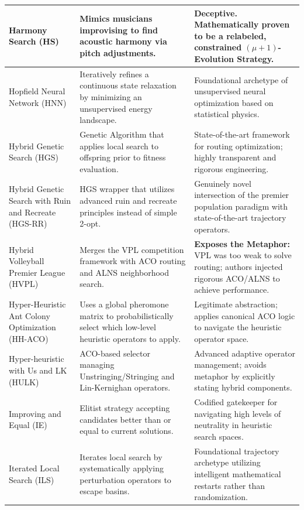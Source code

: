 \documentclass[orivec,runningheads]{llncs}
\begin{document}
\begin{center}
\begin{longtable}
\begin{center}
\begin{longtable}{
  >{\raggedright\arraybackslash}p{}
  >{\raggedright\arraybackslash}p{}
  >{\raggedright\arraybackslash}p{}
}
Harmony Search (HS) & Mimics musicians improvising to find acoustic harmony via pitch adjustments. & \textbf{Deceptive.} Mathematically proven to be a relabeled, constrained $(\mu + 1)$-Evolution Strategy. \\ \midrule

Hopfield Neural Network (HNN) & Iteratively refines a continuous state relaxation by minimizing an unsupervised energy landscape. & Foundational archetype of unsupervised neural optimization based on statistical physics. \\ \midrule

Hybrid Genetic Search (HGS) & Genetic Algorithm that applies local search to offspring prior to fitness evaluation. & State-of-the-art framework for routing optimization; highly transparent and rigorous engineering. \\ \midrule

Hybrid Genetic Search with Ruin and Recreate (HGS-RR) & HGS wrapper that utilizes advanced ruin and recreate principles instead of simple 2-opt. & Genuinely novel intersection of the premier population paradigm with state-of-the-art trajectory operators. \\ \midrule

Hybrid Volleyball Premier League (HVPL) & Merges the VPL competition framework with ACO routing and ALNS neighborhood search. & \textbf{Exposes the Metaphor:} VPL was too weak to solve routing; authors injected rigorous ACO/ALNS to achieve performance. \\ \midrule

Hyper-Heuristic Ant Colony Optimization (HH-ACO) & Uses a global pheromone matrix to probabilistically select which low-level heuristic operators to apply. & Legitimate abstraction; applies canonical ACO logic to navigate the heuristic operator space. \\ \midrule

Hyper-heuristic with Us and LK (HULK) & ACO-based selector managing Unstringing/Stringing and Lin-Kernighan operators. & Advanced adaptive operator management; avoids metaphor by explicitly stating hybrid components. \\ \midrule

Improving and Equal (IE) & Elitist strategy accepting candidates better than or equal to current solutions. & Codified gatekeeper for navigating high levels of neutrality in heuristic search spaces. \\ \midrule

Iterated Local Search (ILS) & Iterates local search by systematically applying perturbation operators to escape basins. & Foundational trajectory archetype utilizing intelligent mathematical restarts rather than randomization. \\ \midrule


\end{longtable}
\end{center}
\end{longtable}
\end{center}
\end{document}
